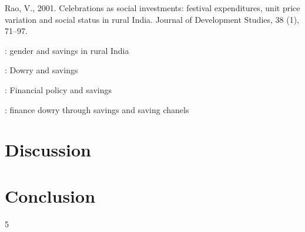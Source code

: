 \documentclass[a4paper, 11pt, onecolumn]{article}
\begin{document}
Rao, V., 2001. Celebrations as social investments: festival expenditures, unit price variation and social status in rural
India. Journal of Development Studies, 38 (1), 71–97.


\cite{Deolalikar1998b} : gender and savings in rural India

\cite{Heyer1992} : Dowry and savings

\cite{Goedecke2018} : Financial policy and savings

\cite{Anukriti2020} : finance dowry through savings and saving chanels







\section{Discussion}

\section*{Conclusion}
\label{section:conclusion}












\newpage




\clearpage
\newpage
\setcounter{tocdepth}5
\tableofcontents

\end{document}
